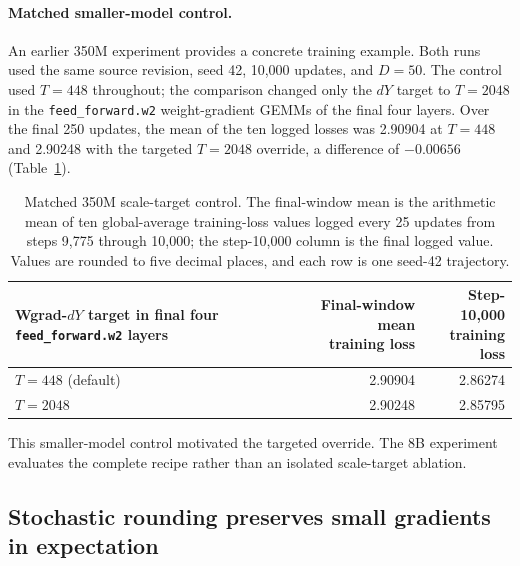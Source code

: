 \documentclass[11pt]{article}
\begin{document}
\paragraph{Matched smaller-model control.}
An earlier 350M experiment provides a concrete training example.  Both runs
used the same source revision, seed 42, 10,000 updates, and $D=50$.  The control
used $T=448$ throughout; the comparison changed only the $dY$ target to
$T=2048$ in the \texttt{feed\_forward.w2} weight-gradient GEMMs of the final
four layers.  Over the final 250 updates, the mean of the ten logged losses was
2.90904 at $T=448$ and 2.90248 with the targeted $T=2048$ override, a
difference of $-0.00656$ (Table~\ref{tab:scale-target-350m-control}).

\begin{table}[H]
  \centering
  \small
  \caption{Matched 350M scale-target control.  The final-window mean is the
  arithmetic mean of ten global-average training-loss values logged every 25
  updates from steps 9,775 through 10,000; the step-10,000 column is the final
  logged value.  Values are rounded to five decimal places, and each row is one
  seed-42 trajectory.}
  \label{tab:scale-target-350m-control}
  \begin{tabular}{@{}lrr@{}}
    \toprule
    Wgrad-$dY$ target in final four \texttt{feed\_forward.w2} layers
      & \shortstack{Final-window mean\\training loss}
      & \shortstack{Step-10,000\\training loss} \\
    \midrule
    $T=448$ (default) & 2.90904 & 2.86274 \\
    $T=2048$          & 2.90248 & 2.85795 \\
    \bottomrule
  \end{tabular}
\end{table}

This smaller-model control motivated the targeted override.  The 8B experiment
evaluates the complete recipe rather than an isolated scale-target ablation.

\subsection{Stochastic rounding preserves small gradients in expectation}
\end{document}
